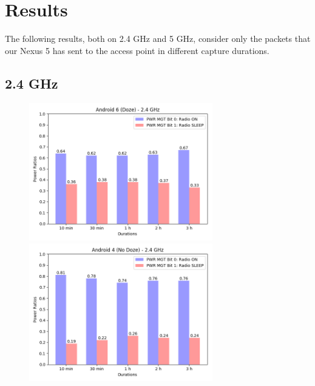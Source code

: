 \documentclass[11pt, a4paper]{article}
\begin{document}
	\newpage
	\section{Results}
	The following results, both on 2.4 GHz and 5 GHz, consider only the packets that our Nexus 5 has sent to the access point in different capture durations. 
	
	\subsection{2.4 GHz}
	    
        \begin{figure}[ht]
           \centerline{
             \includegraphics[width=8cm]{00_doze6_pwr_2_4.png}
             \hfill
             \includegraphics[width=8cm]{01_nodoze4_pwr_2_4.png}
           }
        \end{figure}
\end{document}
